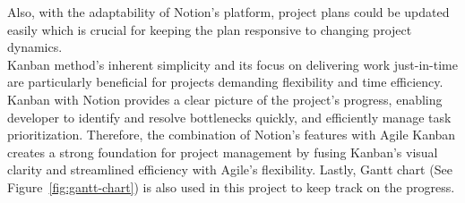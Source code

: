 Also, with the adaptability of Notion's platform, project plans could be updated easily which is crucial for keeping the plan responsive to changing project dynamics.
\\
\indent Kanban method's inherent simplicity and its focus on delivering work just-in-time are particularly beneficial for projects demanding flexibility and time efficiency.
Kanban with Notion provides a clear picture of the project's progress, enabling developer to identify and resolve bottlenecks quickly, and efficiently manage task prioritization.
Therefore, the combination of Notion's features with Agile Kanban creates a strong foundation for project management by fusing Kanban's visual clarity and streamlined efficiency with Agile's flexibility. 
Lastly, Gantt chart (See Figure~\ref{fig:gantt-chart}) is also used in this project to keep track on the progress.
